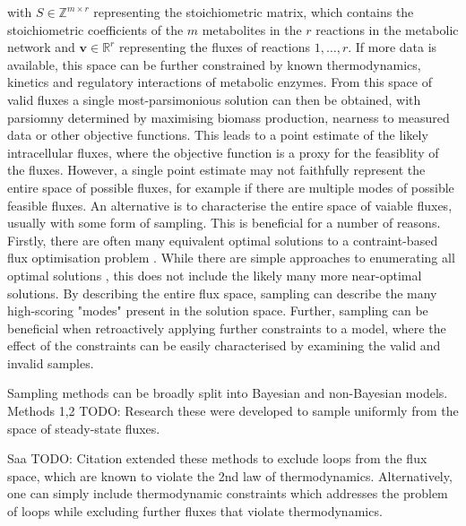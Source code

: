\documentclass[10pt,letterpaper]{article}
\begin{document}
with $S \in \mathbb{Z}^{m\times r}$ representing the stoichiometric matrix, which contains the stoichiometric coefficients of the $m$ metabolites in the $r$ reactions in the metabolic network and $\mathbf{v} \in \mathbb{R}^r$ representing the fluxes of reactions $1,\dots,r$.
If more data is available, this space can be further constrained by known thermodynamics, kinetics and regulatory interactions of metabolic enzymes.
From this space of valid fluxes a single most-parsimonious solution can then be obtained, with parsiomny determined by maximising biomass production, nearness to measured data or other objective functions.
This leads to a point estimate of the likely intracellular fluxes, where the objective function is a proxy for the feasiblity of the fluxes.
However, a single point estimate may not faithfully represent the entire space of possible fluxes, for example if there are multiple modes of possible feasible fluxes.
An alternative is to characterise the entire space of vaiable fluxes, usually with some form of sampling.
This is beneficial for a number of reasons.
Firstly, there are often many equivalent optimal solutions to a contraint-based flux optimisation problem \cite{many_optimal}.
While there are simple approaches to enumerating all optimal solutions \cite{enumerate_optimal}, this does not include the likely many more near-optimal solutions.
By describing the entire flux space, sampling can describe the many high-scoring "modes" present in the solution space.
Further, sampling can be beneficial when retroactively applying further constraints to a model, where the effect of the constraints can be easily characterised by examining the valid and invalid samples.

Sampling methods can be broadly split into Bayesian and non-Bayesian models.
Methods 1,2 {TODO: Research these} were developed to sample uniformly from the space of steady-state fluxes.


Saa {TODO: Citation} extended these methods to exclude loops from the flux space, which are known to violate the 2nd law of thermodynamics.
Alternatively, one can simply include thermodynamic constraints which addresses the problem of loops while excluding further fluxes that violate thermodynamics.
\end{document}
